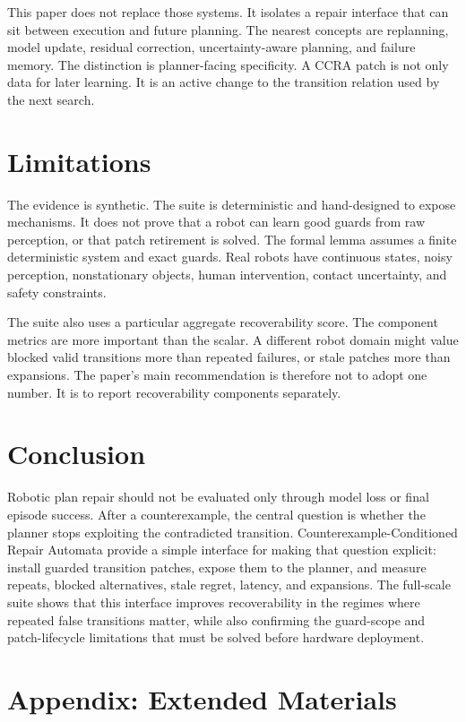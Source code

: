 \documentclass{article}
\newcommand{\ccra}{\textsc{CCRA}}
\begin{document}
This paper does not replace those systems. It isolates a repair interface that
can sit between execution and future planning. The nearest concepts are
replanning, model update, residual correction, uncertainty-aware planning, and
failure memory. The distinction is planner-facing specificity. A \ccra{} patch
is not only data for later learning. It is an active change to the transition
relation used by the next search.

\section{Limitations}

The evidence is synthetic. The suite is deterministic and hand-designed to
expose mechanisms. It does not prove that a robot can learn good guards from raw
perception, or that patch retirement is solved. The formal lemma assumes a
finite deterministic system and exact guards. Real robots have continuous
states, noisy perception, nonstationary objects, human intervention, contact
uncertainty, and safety constraints.

The suite also uses a particular aggregate recoverability score. The component
metrics are more important than the scalar. A different robot domain might value
blocked valid transitions more than repeated failures, or stale patches more
than expansions. The paper's main recommendation is therefore not to adopt one
number. It is to report recoverability components separately.

\section{Conclusion}

Robotic plan repair should not be evaluated only through model loss or final
episode success. After a counterexample, the central question is whether the
planner stops exploiting the contradicted transition. Counterexample-Conditioned
Repair Automata provide a simple interface for making that question explicit:
install guarded transition patches, expose them to the planner, and measure
repeats, blocked alternatives, stale regret, latency, and expansions. The
full-scale suite shows that this interface improves recoverability in the
regimes where repeated false transitions matter, while also confirming the
guard-scope and patch-lifecycle limitations that must be solved before hardware
deployment.

\section{Appendix: Extended Materials}
\end{document}
